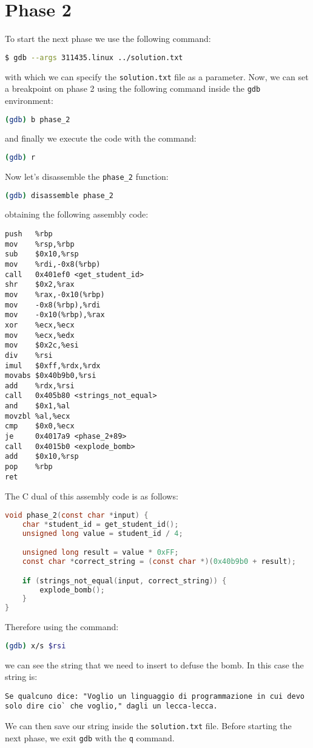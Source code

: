 \documentclass[a4paper,12pt]{report}  %
\newcommand{\lstinlinebg}[1]{\colorbox{backcolour}{\lstinline|#1|}}
\begin{document}
\section{Phase 2}
To start the next phase we use the following command:
\begin{lstlisting}[language=bash,numbers=none]
$ gdb --args 311435.linux ../solution.txt
\end{lstlisting}
with which we can specify the \lstinlinebg{solution.txt} file as a parameter.
Now, we can set a breakpoint on phase 2 using the following command inside the \lstinlinebg{gdb} environment:
\begin{lstlisting}[language=bash, numbers=none]
(gdb) b phase_2
\end{lstlisting}
and finally we execute the code with the command:
\begin{lstlisting}[language=bash, numbers=none]
(gdb) r
\end{lstlisting}
Now let's disassemble the \lstinlinebg{phase_2} function:
\begin{lstlisting}[language=bash, numbers=none]
(gdb) disassemble phase_2
\end{lstlisting}
obtaining the following assembly code:
\begin{lstlisting}[language=x86_64]
push   %rbp
mov    %rsp,%rbp
sub    $0x10,%rsp
mov    %rdi,-0x8(%rbp)
call   0x401ef0 <get_student_id>
shr    $0x2,%rax
mov    %rax,-0x10(%rbp)
mov    -0x8(%rbp),%rdi
mov    -0x10(%rbp),%rax
xor    %ecx,%ecx
mov    %ecx,%edx
mov    $0x2c,%esi
div    %rsi
imul   $0xff,%rdx,%rdx
movabs $0x40b9b0,%rsi
add    %rdx,%rsi
call   0x405b80 <strings_not_equal>
and    $0x1,%al
movzbl %al,%ecx
cmp    $0x0,%ecx
je     0x4017a9 <phase_2+89>
call   0x4015b0 <explode_bomb>
add    $0x10,%rsp
pop    %rbp
ret
\end{lstlisting}
The C dual of this assembly code is as follows:
\begin{lstlisting}[language=C,keywords={int, char, if, void, get_student_id, strings_not_equal, const, unsigned, long, explode_bomb}]
void phase_2(const char *input) {
    char *student_id = get_student_id();
    unsigned long value = student_id / 4;

    unsigned long result = value * 0xFF;
    const char *correct_string = (const char *)(0x40b9b0 + result);

    if (strings_not_equal(input, correct_string)) {
        explode_bomb();
    }
}
\end{lstlisting}
Therefore using the command:
\begin{lstlisting}[language=bash, numbers=none]
(gdb) x/s $rsi
\end{lstlisting}
we can see the string that we need to insert to defuse the bomb.
In this case the string is:
\begin{lstlisting}[numbers=none]
Se qualcuno dice: "Voglio un linguaggio di programmazione in cui devo solo dire cio` che voglio," dagli un lecca-lecca.
\end{lstlisting}
We can then save our string inside the \lstinlinebg{solution.txt} file.
Before starting the next phase, we exit \lstinlinebg{gdb} with the \lstinlinebg{q} command.
\end{document}
